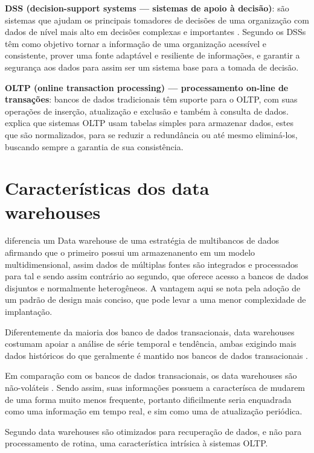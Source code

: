 \textbf{DSS (decision-support systems — sistemas de apoio à decisão)}:
são sistemas que ajudam os principais tomadores de decisões de uma organização com dados de nível mais alto em decisões complexas e importantes \cite{elmasri_sistemas_2011}. Segundo   os DSSs têm como objetivo tornar a informação de uma organização acessível e consistente, prover uma fonte adaptável e resiliente de informações, e garantir a segurança aos dados para assim ser um sistema base para a tomada de decisão.

\textbf{OLTP (online transaction processing) — processamento on-line de transações}:
bancos de dados tradicionais têm suporte para o OLTP, com suas operações de inserção, atualização e exclusão e também à consulta de dados.  explica que sistemas OLTP usam tabelas simples para armazenar dados, estes que são normalizados, para se reduzir a redundância ou até mesmo eliminá-los, buscando sempre a garantia de sua consistência.


\section{Características dos data warehouses}\label{sec:caract-dw}


 diferencia um Data warehouse de uma estratégia de multibancos de dados afirmando que o primeiro possui um armazenanento em um modelo multidimensional, assim dados de múltiplas fontes são integrados e processados para tal e sendo assim contrário ao segundo, que oferece acesso a bancos de dados disjuntos e normalmente heterogêneos. 
A vantagem aqui se nota pela adoção de um padrão de design mais conciso, que pode levar a uma menor complexidade de implantação.

Diferentemente da maioria dos banco de dados transacionais, data warehouses costumam apoiar a análise de série temporal e tendência, ambas exigindo mais dados históricos do que geralmente é mantido nos bancos de dados transacionais \cite{elmasri_sistemas_2011}.

Em comparação com os bancos de dados transacionais, os data warehouses são não-voláteis \cite{elmasri_sistemas_2011}. Sendo assim, suas informações possuem a caracterísca de mudarem de uma forma muito menos frequente, portanto dificilmente seria enquadrada como uma informação em tempo real, e sim como uma de atualização periódica.

Segundo  data warehouses são otimizados para recuperação de dados, e não para processamento de rotina, uma característica intrísica à sistemas OLTP.


